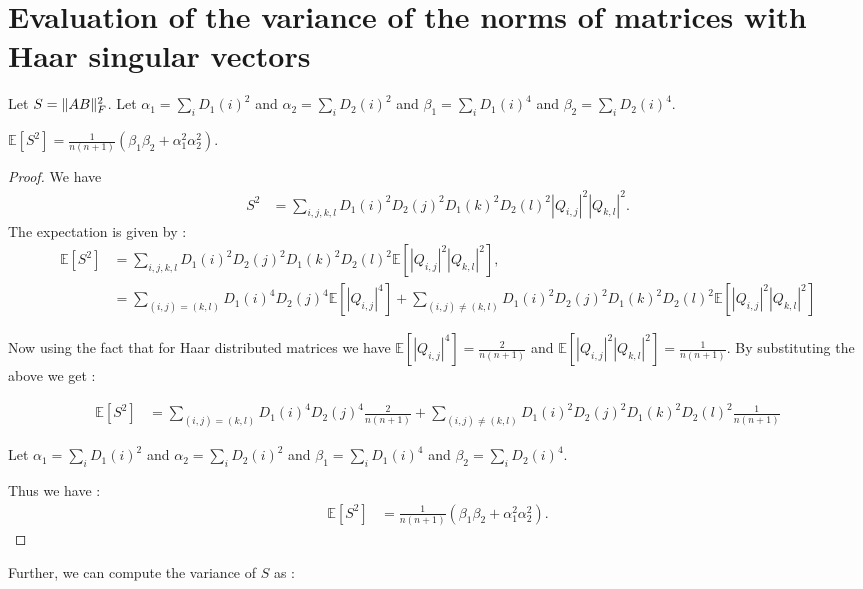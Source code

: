 \documentclass[onefignum,onetabnum]{siamart171218}
\DeclarePairedDelimiter\norm{\lVert}{\rVert}
\begin{document}
\section{Evaluation of the variance of the norms of matrices with Haar singular vectors}
Let $S = \norm{AB}_F^2$.  Let $\alpha_1 = \sum_{i} D_1(i)^2$ and $\alpha_2 = \sum_{i} D_2(i)^2$ and $\beta_1 = \sum_{i} D_1(i)^4$ and $\beta_2 = \sum_{i} D_2(i)^4$.

\begin{lemma}
$\mathbb{E}[S^2] = \frac{1}{n(n+1)} (\beta_1 \beta_2 + \alpha_1^2 \alpha_2^2).$
\end{lemma}
\begin{proof}
    We have 
    \begin{align*}
        S^2 &= \sum_{i,j,k,l} D_1(i)^2 D_2(j)^2 D_1(k)^2 D_2(l)^2|Q_{i,j}|^2 |Q_{k,l}|^2 .
    \end{align*}
    The expectation is given by :
     \begin{align*}
        \mathbb{E}[S^2] &= \sum_{i,j,k,l}  D_1(i)^2 D_2(j)^2 D_1(k)^2 D_2(l)^2 \mathbb{E}[|Q_{i,j}|^2 |Q_{k,l}|^2], \\
        &= \sum_{(i,j) = (k,l)} D_1(i)^4 D_2(j)^4\mathbb{E}[|Q_{i,j}|^4] + \sum_{(i,j) \neq (k,l)}  D_1(i)^2 D_2(j)^2 D_1(k)^2 D_2(l)^2 \mathbb{E}[|Q_{i,j}|^2 |Q_{k,l}|^2] 
    \end{align*}

    Now using the fact that for Haar distributed matrices we have $\mathbb{E}[|Q_{i,j}|^4]  = \frac{2}{n(n+1)}$ and $\mathbb{E}[|Q_{i,j}|^2 |Q_{k,l}|^2]  = \frac{1}{n(n+1)}$. By substituting the above we get :

    \begin{align*}
         \mathbb{E}[S^2] &=  \sum_{(i,j) = (k,l)} D_1(i)^4 D_2(j)^4 \frac{2}{n (n+1)} + \sum_{(i,j) \neq (k,l)}  D_1(i)^2 D_2(j)^2 D_1(k)^2 D_2(l)^2 \frac{1}{n(n+1)}
    \end{align*}

    Let $\alpha_1 = \sum_{i} D_1(i)^2$ and $\alpha_2 = \sum_{i} D_2(i)^2$ and $\beta_1 = \sum_{i} D_1(i)^4$ and $\beta_2 = \sum_{i} D_2(i)^4$.

    Thus we have :
    \begin{align*}
         \mathbb{E}[S^2] &= \frac{1}{n(n+1)} (\beta_1 \beta_2 + \alpha_1^2 \alpha_2^2).
    \end{align*}
\end{proof}

Further, we can compute the variance of $S$ as :
\end{document}
